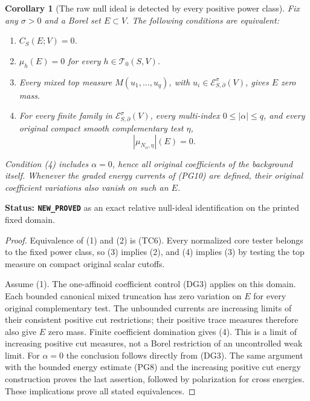 \documentclass[11pt,a4paper]{article}
\numberwithin{equation}{section}
\newtheorem{corollary}[theorem]{Corollary}
\theoremstyle{definition}
\theoremstyle{remark}
\begin{document}
\begin{corollary}[The raw null ideal is detected by every positive power class]
\label{cor:r11-power-class-null-ideal}
Fix any $\sigma>0$ and a Borel set $E\subset V$.
The following conditions are equivalent:
\begin{enumerate}
\item $C_S(E;V)=0$.
\item $\mu_h(E)=0$ for every $h\in\mathscr T_0(S,V)$.
\item Every mixed top measure
$M(u_1,\ldots,u_q)$, with
$u_i\in\mathcal E^\sigma_{S,\partial}(V)$, gives $E$ zero mass.
\item For every finite family in
$\mathcal E^\sigma_{S,\partial}(V)$, every multi-index
$0\leq|\alpha|\leq q$, and every original compact smooth
complementary test $\eta$,
\[
                              |\mu_{N_\alpha,\eta}|(E)=0.
 \tag{TC9}
\]
\end{enumerate}
Condition (4) includes $\alpha=0$, hence all original
coefficients of the background itself.
Whenever the graded energy currents of (PG10) are defined,
their original coefficient variations also vanish on such an $E$.
\end{corollary}

\noindent\textbf{Status: \texttt{NEW\_PROVED}} as an exact
relative null-ideal identification on the printed fixed domain.

\begin{proof}
Equivalence of (1) and (2) is (TC6).
Every normalized core tester belongs to the fixed power class,
so (3) implies (2), and (4) implies (3) by testing the top
measure on compact original scalar cutoffs.

Assume (1). The one-affinoid coefficient control (DG3) applies
on this domain. Each bounded canonical mixed truncation has
zero variation on $E$ for every original complementary test.
The unbounded currents are increasing limits of their consistent
positive cut restrictions; their positive trace measures therefore
also give $E$ zero mass. Finite coefficient domination gives
(4). This is a limit of increasing positive cut measures, not
a Borel restriction of an uncontrolled weak limit.
For $\alpha=0$ the conclusion follows directly from (DG3).
The same argument with the bounded energy estimate (PG8) and
the increasing positive cut energy construction proves the
last assertion, followed by polarization for cross energies.
These implications prove all stated equivalences.
\end{proof}
\end{document}
